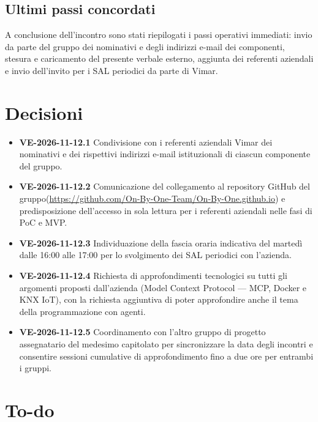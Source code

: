\documentclass[11pt, a4paper]{article}
\begin{document}
\subsection{Ultimi passi concordati}
A conclusione dell'incontro sono stati riepilogati i passi operativi immediati: invio da parte del gruppo dei nominativi e degli indirizzi e-mail dei componenti, stesura e caricamento del presente verbale esterno, aggiunta dei referenti aziendali e invio dell'invito per i SAL periodici da parte di Vimar.




\section{Decisioni}

\begin{itemize}
    \item \textbf{VE-2026-11-12.1} Condivisione con i referenti aziendali Vimar dei nominativi e dei rispettivi indirizzi e-mail istituzionali di ciascun componente del gruppo.

    \item \textbf{VE-2026-11-12.2} Comunicazione del collegamento al repository GitHub del gruppo\newline(\url{https://github.com/On-By-One-Team/On-By-One.github.io}) e predisposizione dell'accesso in sola lettura per i referenti aziendali nelle fasi di PoC e MVP.

    \item \textbf{VE-2026-11-12.3} Individuazione della fascia oraria indicativa del martedì dalle 16:00 alle 17:00 per lo svolgimento dei SAL periodici con l'azienda.

    \item \textbf{VE-2026-11-12.4} Richiesta di approfondimenti tecnologici su tutti gli argomenti proposti dall'azienda (Model Context Protocol --- MCP, Docker e KNX IoT), con la richiesta aggiuntiva di poter approfondire anche il tema della programmazione con agenti.

    \item \textbf{VE-2026-11-12.5} Coordinamento con l'altro gruppo di progetto assegnatario del medesimo capitolato per sincronizzare la data degli incontri e consentire sessioni cumulative di approfondimento fino a due ore per entrambi i gruppi.
\end{itemize}

\newpage
\section{To-do}
\end{document}
